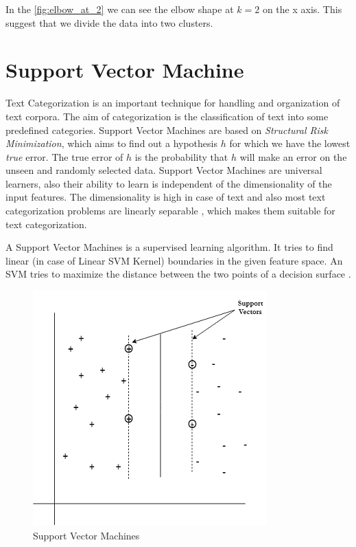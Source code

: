 In the \ref{fig:elbow_at_2} we can see the elbow shape at $k=2$ on the x axis. This suggest that we divide the data into two clusters.


\clearpage
\section{Support Vector Machine}\label{sec:svm}
Text Categorization is an important technique for handling and organization of text corpora. The aim of categorization is the classification of text into some predefined categories. Support Vector Machines are based on \textit{Structural Risk Minimization},
which aims to find out a hypothesis $h$ for which we have the lowest \textit{true} error. The true error of $h$ is the probability that $h$ will make an error on the unseen and randomly selected data. Support Vector Machines are universal learners, also their ability to learn is independent of the dimensionality  of the input features. The dimensionality is high in case of text and also most text categorization problems are linearly separable \cite{joachims1998text}, which makes them suitable for text categorization.   

A Support Vector Machines is a supervised learning algorithm. It tries to find linear (in case of Linear SVM Kernel) boundaries in the given feature space. An SVM tries to maximize the distance between the two points of a decision surface \cite{manning2010introduction}.

\begin{figure}[!ht]
    \centering
    \includegraphics{pics/svm.png}
    \captionsetup{justification=centering,margin=2cm}
    \caption{Support Vector Machines}
    \label{fig:svm}
\end{figure}

